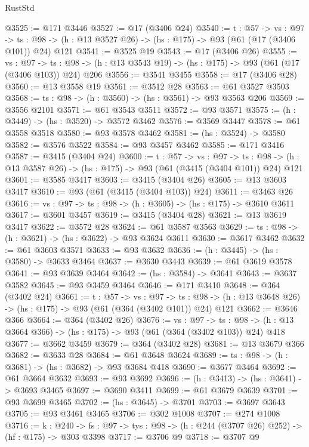 \begin{lexlean}{RustStd}
\begin{coremodule}
{\begin{coremodule}
{{{{{{{{{@3525 := @171 @3446
@3527 := @17 (@3406 @24)
@3540 := {t : @57} ->
  {vs : @97} ->
  {ts : @98} -> (h : @13 @3527 @26) -> (hs : @175) -> @93 (@61 (@17 (@3406 @101)) @24) @121
@3541 := @3525 @19
@3543 := @17 (@3406 @26)
@3555 := {vs : @97} ->
  {ts : @98} -> (h : @13 @3543 @19) -> (hs : @175) -> @93 (@61 (@17 (@3406 @103)) @24) @206
@3556 := @3541 @3455
@3558 := @17 (@3406 @28)
@3560 := @13 @3558 @19
@3561 := @3512 @28
@3563 := @61 @3527 @3503
@3568 := {ts : @98} -> (h : @3560) -> (hs : @3561) -> @93 @3563 @206
@3569 := @3556 @2101
@3571 := @61 @3543 @3511
@3572 := @93 @3571
@3575 := (h : @3449) -> (hs : @3520) -> @3572 @3462
@3576 := @3569 @3447
@3578 := @61 @3558 @3518
@3580 := @93 @3578 @3462
@3581 := (hs : @3524) -> @3580
@3582 := @3576 @3522
@3584 := @93 @3457 @3462
@3585 := @171 @3416
@3587 := @3415 (@3404 @24)
@3600 := {t : @57} ->
  {vs : @97} ->
  {ts : @98} -> (h : @13 @3587 @26) -> (hs : @175) -> @93 (@61 (@3415 (@3404 @101)) @24) @121
@3601 := @3585 @3417
@3603 := @3415 (@3404 @26)
@3605 := @13 @3603 @3417
@3610 := @93 (@61 (@3415 (@3404 @103)) @24)
@3611 := @3463 @26
@3616 := {vs : @97} -> {ts : @98} -> (h : @3605) -> (hs : @175) -> @3610 @3611
@3617 := @3601 @3457
@3619 := @3415 (@3404 @28)
@3621 := @13 @3619 @3417
@3622 := @3572 @28
@3624 := @61 @3587 @3563
@3629 := {ts : @98} -> (h : @3621) -> (hs : @3622) -> @93 @3624 @3611
@3630 := @3617 @3462
@3632 := @61 @3603 @3571
@3633 := @93 @3632
@3636 := (h : @3445) -> (hs : @3580) -> @3633 @3464
@3637 := @3630 @3443
@3639 := @61 @3619 @3578
@3641 := @93 @3639 @3464
@3642 := (hs : @3584) -> @3641
@3643 := @3637 @3582
@3645 := @93 @3459 @3464
@3646 := @171 @3410
@3648 := @364 (@3402 @24)
@3661 := {t : @57} ->
  {vs : @97} ->
  {ts : @98} -> (h : @13 @3648 @26) -> (hs : @175) -> @93 (@61 (@364 (@3402 @101)) @24) @121
@3662 := @3646 @366
@3664 := @364 (@3402 @26)
@3676 := {vs : @97} ->
  {ts : @98} -> (h : @13 @3664 @366) -> (hs : @175) -> @93 (@61 (@364 (@3402 @103)) @24) @418
@3677 := @3662 @3459
@3679 := @364 (@3402 @28)
@3681 := @13 @3679 @366
@3682 := @3633 @28
@3684 := @61 @3648 @3624
@3689 := {ts : @98} -> (h : @3681) -> (hs : @3682) -> @93 @3684 @418
@3690 := @3677 @3464
@3692 := @61 @3664 @3632
@3693 := @93 @3692
@3696 := (h : @3413) -> (hs : @3641) -> @3693 @3465
@3697 := @3690 @3411
@3699 := @61 @3679 @3639
@3701 := @93 @3699 @3465
@3702 := (hs : @3645) -> @3701
@3703 := @3697 @3643
@3705 := @93 @3461 @3465
@3706 := @302 @1008
@3707 := @274 @1008
@3716 := {k : @240} ->
  {fs : @97} -> {tys : @98} -> (h : @244 (@3707 @26) @252) -> (hf : @175) -> @303 @3398
@3717 := @3706 @9
@3718 := @3707 @9
}}}}}}}}}
\end{coremodule}}
\end{coremodule}
\end{lexlean}
